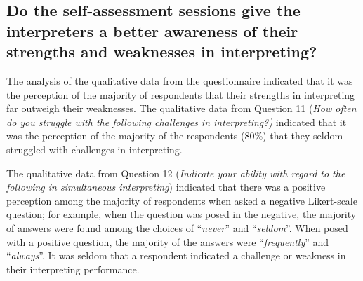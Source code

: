 \documentclass[output=paper]{langsci/langscibook}
\begin{document}
\begin{table}
\caption{\label{tab:deysel:5}Comparison of ratings for experimental and control group}
\end{table}

\subsection{Do the self-assessment sessions give the interpreters a better awareness of their strengths and weaknesses in interpreting?}

The analysis of the qualitative data from the questionnaire indicated that it was the perception of the majority of respondents that their strengths in interpreting far outweigh their weaknesses. The qualitative data from Question 11 (\textit{How often do you struggle with the following challenges in interpreting?)} indicated that it was the perception of the majority of the respondents (80\%) that they seldom struggled with challenges in interpreting. 

The qualitative data from Question 12 (\textit{Indicate your ability with regard to the following in simultaneous interpreting}) indicated that there was a positive perception among the majority of respondents when asked a negative Likert-scale question; for example, when the question was posed in the negative, the majority of answers were found among the choices of “\textit{never}” and “\textit{seldom}”. When posed with a positive question, the majority of the answers were “\textit{frequently}” and “\textit{always}”. It was seldom that a respondent indicated a challenge or weakness in their interpreting performance. 
\end{document}
